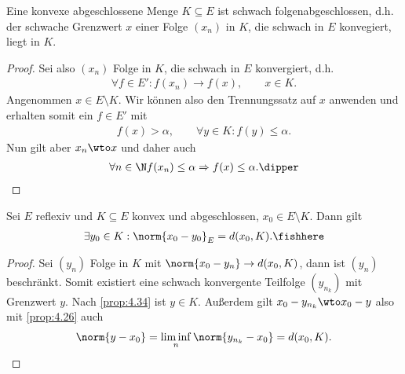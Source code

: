 \begin{prop}
\label{prop:4.34}
Eine konvexe abgeschlossene Menge $K\subseteq E$ ist schwach
folgenabgeschlossen, d.h. der schwache Grenzwert $x$ einer Folge $(x_n)$ in $K$,
die schwach in $E$ konvegiert, liegt in $K$.\fishhere
\end{prop}
\begin{proof}
Sei also $(x_n)$ Folge in $K$, die schwach in $E$ konvergiert, d.h.
\begin{align*}
\forall f\in E': f(x_n)\to f(x),\qquad x\in K.
\end{align*}
Angenommen $x\in E\setminus K$. Wir können also den Trennungssatz auf $x$
anwenden und erhalten somit ein $f\in E'$ mit
\begin{align*}
f(x) > \alpha,\qquad \forall y\in K : f(y)\le \alpha.
\end{align*}
Nun gilt aber $x_n\wto x$ und daher auch
\begin{align*}
\forall n\in \N f(x_n)\le \alpha \Rightarrow f(x) \le \alpha.\dipper\qedhere
\end{align*}
\end{proof}

\begin{prop}
\label{prop:4.35}
Sei $E$ reflexiv und $K\subseteq E$ konvex und abgeschlossen, $x_0\in
E\setminus K$. Dann gilt
\begin{align*}
\exists y_0\in K : \norm{x_0-y_0}_E = d(x_0,K).\fishhere
\end{align*}
\end{prop}
\begin{proof}
Sei $(y_n)$ Folge in $K$ mit $\norm{x_0-y_n} \to d(x_0,K)$, dann ist $(y_n)$
beschränkt. Somit existiert eine schwach konvergente Teilfolge $(y_{n_k})$ mit
Grenzwert $y$. Nach \ref{prop:4.34} ist $y\in K$. Außerdem gilt $x_0-y_{n_k}\wto
x_0-y$ also mit \ref{prop:4.26} auch
\begin{align*}
\norm{y-x_0} = \liminf_n \norm{y_{n_k}-x_0} = d(x_0,K).\qedhere
\end{align*}
\end{proof}

